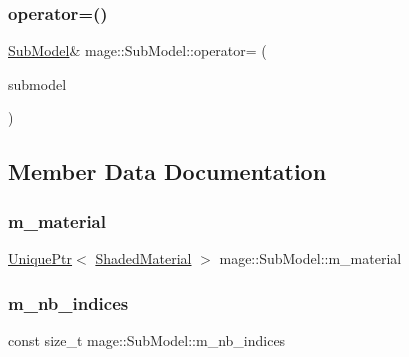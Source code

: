 \hypertarget{classmage_1_1_sub_model_a616b8007e767deebc248485fb8d26773}{}\label{classmage_1_1_sub_model_a616b8007e767deebc248485fb8d26773} 
\subsubsection{\texorpdfstring{operator=()}{operator=()}\hspace{0.1cm}{\footnotesize\ttfamily [2/2]}}
{\footnotesize\ttfamily \hyperlink{classmage_1_1_sub_model}{Sub\+Model}\& mage\+::\+Sub\+Model\+::operator= (\begin{DoxyParamCaption}\item[{\hyperlink{classmage_1_1_sub_model}{Sub\+Model} \&\&}]{submodel }\end{DoxyParamCaption})\hspace{0.3cm}{\ttfamily [delete]}}



\subsection{Member Data Documentation}
\hypertarget{classmage_1_1_sub_model_a162ac42efa17ae49d14ce0fc42c7449c}{}\label{classmage_1_1_sub_model_a162ac42efa17ae49d14ce0fc42c7449c} 
\subsubsection{\texorpdfstring{m\+\_\+material}{m\_material}}
{\footnotesize\ttfamily \hyperlink{namespacemage_a8c307fbcc33bce9b7f2aa4c26c3b95cf}{Unique\+Ptr}$<$ \hyperlink{structmage_1_1_shaded_material}{Shaded\+Material} $>$ mage\+::\+Sub\+Model\+::m\+\_\+material\hspace{0.3cm}{\ttfamily [private]}}

\hypertarget{classmage_1_1_sub_model_a0471b8b0c4b7be0e696378238b25e7e7}{}\label{classmage_1_1_sub_model_a0471b8b0c4b7be0e696378238b25e7e7} 
\subsubsection{\texorpdfstring{m\+\_\+nb\+\_\+indices}{m\_nb\_indices}}
{\footnotesize\ttfamily const size\+\_\+t mage\+::\+Sub\+Model\+::m\+\_\+nb\+\_\+indices\hspace{0.3cm}{\ttfamily [private]}}

